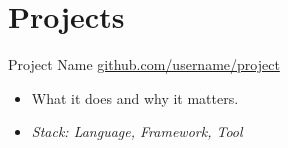 \section{Projects}

%
  {Project Name}%
  {\href{https://github.com/username/project}{github.com/username/project}}{}{}%
{%
  \begin{itemize}
    \item What it does and why it matters.
    \item \textit{Stack: Language, Framework, Tool}
  \end{itemize}%
}
